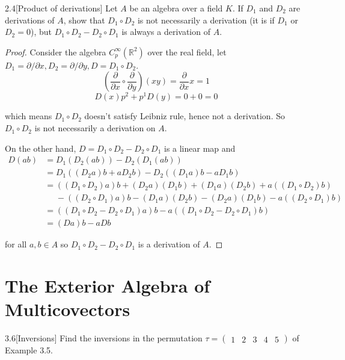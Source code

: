 \begin{problem}{2.4}[Product of derivations]
Let \( A \) be an algebra over a field \( K \). If \( D_{1} \) and \( D_{2} \) are derivations of \( A \), show that \( D_{1} \circ D_{2} \) is not necessarily a derivation (it is if \( D_{1} \) or \( D_{2} = 0 \)), but \( D_{1} \circ D_{2} - D_{2} \circ D_{1} \) is always a derivation of \( A \).
\end{problem}

\begin{proof}
	Consider the algebra \( C^{\infty}_{p}(\mathbb{R}^{2}) \) over the real field, let \( D_{1} = \partial/\partial x, D_{2} = \partial/\partial y, D = D_{1} \circ D_{2} \).
	\[
		\left(\frac{\partial}{\partial x}\circ \frac{\partial}{\partial y}\right)(xy) = \frac{\partial}{\partial x} x = 1
	\]
	\[
		D(x) p^{2} + p^{1}D(y) = 0 + 0 = 0
	\]

	which means \( D_{1} \circ D_{2} \) doesn't satisfy Leibniz rule, hence not a derivation. So \( D_{1} \circ D_{2} \) is not necessarily a derivation on \( A \).

	On the other hand, \( D = D_{1}\circ D_{2} - D_{2}\circ D_{1} \) is a linear map and
	\begin{align*}
		D(ab) & = D_{1}(D_{2}(ab)) - D_{2}(D_{1}(ab))                                                               \\
		      & = D_{1}((D_{2}a)b + aD_{2}b) - D_{2}((D_{1}a)b - aD_{1}b)                                           \\
		      & = ((D_{1}\circ D_{2})a)b + (D_{2}a)(D_{1}b) + (D_{1}a)(D_{2}b) + a((D_{1}\circ D_{2})b)             \\
		      & \phantom{=} - ((D_{2}\circ D_{1})a)b - (D_{1}a)(D_{2}b) - (D_{2}a)(D_{1}b) - a((D_{2}\circ D_{1})b) \\
		      & = ((D_{1}\circ D_{2} - D_{2}\circ D_{1})a)b - a((D_{1}\circ D_{2} - D_{2}\circ D_{1})b)             \\
		      & = (Da)b - aDb
	\end{align*}

	for all \( a, b \in A \) so \( D_{1}\circ D_{2} - D_{2}\circ D_{1} \) is a derivation of \( A \).
\end{proof}

\section{The Exterior Algebra of Multicovectors}

\begin{exercise}{3.6}[Inversions]
	Find the inversions in the permutation \( \tau = \begin{pmatrix}1 & 2 & 3 & 4 & 5\end{pmatrix} \) of Example 3.5.
\end{exercise}

